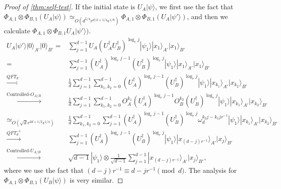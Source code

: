 \documentclass[11pt,letterpaper]{article}
\newcommand{\ket}[1]{|#1\rangle}
\newcommand{\x}{\otimes}
\newcommand{\ct}{^{\dagger}}
\newcommand{\1}{\mathbb{1}}
\newcommand{\ep}{\epsilon}
\newcommand{\qe}{\epsilon^{1/4}}
\newcommand{\sd}{\sqrt{d}}
\newcommand{\appd}[1]{\simeq_{#1}}
\theoremstyle{definition}
\begin{document}
\begin{proof}[Proof of \cref{thm:self-test}]
If the initial state is $U_A\ket{\psi}$, we first use the fact that 
$ \Phi_{A,1} \x \Phi_{B,1} (U_A\ket{\psi}) \appd{O(d^{5/4}r^{d/2+1/4} \ep^{1/8})}  \Phi_{A,1} \x \Phi_{B,1} (U_A\ket{\psi'})$, 
and then we calculate $\Phi_{A,1} \x \Phi_{B,1} U_A\ket{\psi'})$.
\begin{align}
	U_A \ket{\psi'} \ket{0}_{A'}\ket{0}_{B'} =&  
		\sum_{j=1}^{d-1} U_A(U_A\ct U_B\ct)^{\log_r j}\ket{\psi_1} \ket{x_1}_{A'}\ket{x_1}_{B'}\\
		=&\sum_{j=1}^{d-1}(U_A\ct)^{\log_r j-1}  (U_B\ct)^{\log_r j} \ket{\psi_1} \ket{x_1}_{A'}\ket{x_1}_{B'}\\
		\xrightarrow[]{QFT_d} &\frac{1}{d}\sum_{j=1}^{d-1} \sum_{k_1,k_2 = 0}^{d-1}(U_A\ct)^{\log_r j-1} (U_B\ct)^{\log_r j} \ket{\psi_1}  \ket{x_{k_1}}_{A'}\ket{x_{k_2}}_{B'}\\
		\xrightarrow[]{\text{Controlled-}O_{A/B}}&\frac{1}{d}\sum_{j=1}^{d-1}\sum_{k_1,k_2 = 0}^{d-1} 
		 O_A^{k_1}(U_A\ct)^{\log_r j-1} O_B^{k_2}(U_B\ct)^{\log_r j} \ket{\psi_1} 
		 \ket{x_{k_1}}_{A'}\ket{x_{k_2}}_{B'}\\
		\appd{O(\sd r^{2d+1/2} \qe)}& \frac{1}{d}\sum_{k_1,k_2 = 0}^{d-1} \sum_{j=1}^{d-1} (U_A\ct)^{\log_r j-1} (U_B\ct)^{\log_r j}
		\omega_d^{k_2j-k_1jr^{-1}}\ket{\psi_1}
		 \ket{x_{k_1}}_{A'}\ket{x_{k_2}}_{B'}\\
		\xrightarrow[]{QFT_d^{-1}}& \sum_{j=1}^{d-1}  (U_A\ct)^{\log_r j-1} (U_B\ct)^{\log_r j}  
		\ket{\psi_1} \ket{x_{(d-j)r^{-1}}}_{A'}\ket{x_j}_{B'}\\
		\xrightarrow[]{\text{Controlled-}U_{A/B}}& \sqrt{d-1} \ket{\psi_1} \x  
		\frac{1}{\sqrt{d-1}} \sum_{j=1}^{d-1} \ket{x_{(d-j)r^{-1}}}_{A'}\ket{x_j}_{B'},
\end{align}
where we use the fact that $(d-j)r^{-1} \equiv d -jr^{-1} \pmod{d}$.
The analysis for $\Phi_{A,1} \x\Phi_{B,1} (U_B \ket{\psi})$ is very similar.
\end{proof}
\end{document}
